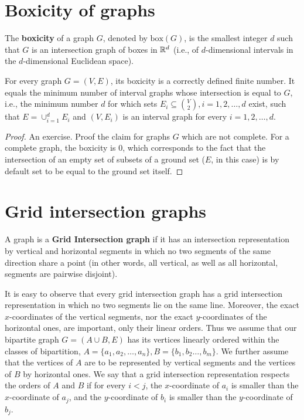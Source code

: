 \section{Boxicity of graphs}

\begin{defn}
	The \textbf{boxicity} of a graph $G$, denoted by $\text{box}(G)$, is the smallest integer $d$ such that $G$ is an intersection graph of boxes in $\mathbb{R}^d$ (i.e., of $d$-dimensional intervals in the $d$-dimensional Euclidean space).
\end{defn}

\begin{prop}
For every graph $G = (V, E)$, its boxicity is a correctly defined finite number. It equals the minimum number of interval graphs whose intersection is equal to $G$, i.e., the minimum number $d$ for which sets $E_i \subseteq \binom{V}{2} , i = 1, 2, \dots, d$ exist, such that $E = \cup_{i=1}^d E_i$ and $(V, E_i)$ is an interval graph for every $i = 1, 2, \dots, d$.
\end{prop}

\begin{proof}
	An exercise. Proof the claim for graphs $G$ which are not complete. For a complete graph, the boxicity is $0$, which corresponds to the fact that the intersection of an empty set of subsets of a ground set ($E$, in this case) is by default set to be equal to the ground set itself.
\end{proof}

\section{Grid intersection graphs}

\begin{defn}
	A graph is a \textbf{Grid Intersection graph} if it has an intersection representation by vertical and horizontal segments in which no two segments of the same direction share a point (in other words, all vertical, as well as all horizontal, segments are pairwise disjoint).
\end{defn}

It is easy to observe that every grid intersection graph has a grid intersection representation in which no two segments lie on the same line. Moreover, the exact $x$-coordinates of the vertical segments, nor the exact $y$-coordinates of the horizontal ones, are important, only their linear orders. Thus we assume that our bipartite graph $G = (A \cup B, E)$ has its vertices linearly ordered within the classes of bipartition, $A = \{a_1 , a_2 , \dots, a_n\}, B = \{b_1 , b_2 \dots, b_m\}$. We further assume that the vertices of $A$ are to be represented by vertical segments and the vertices of $B$ by horizontal ones. We say that a grid intersection representation respects the orders of $A$ and $B$ if for every $i < j$, the $x$-coordinate of $a_i$ is smaller than the $x$-coordinate of $a_j$, and the $y$-coordinate of $b_i$ is smaller than the $y$-coordinate of $b_j$.


